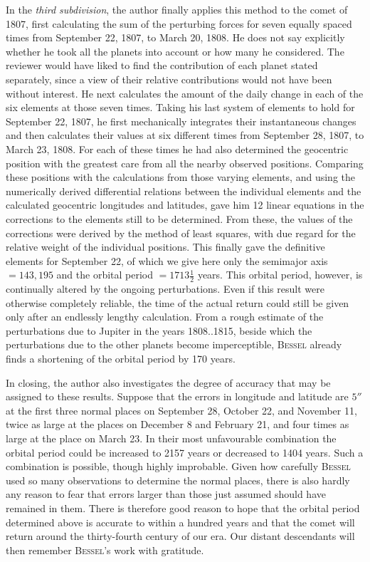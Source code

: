 In the \emph{third subdivision}, the author finally applies this method to the comet of 1807, first calculating the sum of the perturbing forces for seven equally spaced times from September 22, 1807, to March 20, 1808. He does not say explicitly whether he took all the planets into account or how many he considered. The reviewer would have liked to find the contribution of each planet stated separately, since a view of their relative contributions would not have been without interest. He next calculates the amount of the daily change in each of the six elements at those seven times. Taking his last system of elements to hold for September 22, 1807, he first mechanically integrates their instantaneous changes and then calculates their values at six different times from September 28, 1807, to March 23, 1808. For each of these times he had also determined the geocentric position with the greatest care from all the nearby observed positions. Comparing these positions with the calculations from those varying elements, and using the numerically derived differential relations between the individual elements and the calculated geocentric longitudes and latitudes, gave him 12 linear equations in the corrections to the elements still to be determined. From these, the values of the corrections were derived by the method of least squares, with due regard for the relative weight of the individual positions. This finally gave the definitive elements for September 22, of which we give here only the semimajor axis $= 143{,}195$ and the orbital period $= 1713\tfrac{1}{2}$ years. This orbital period, however, is continually altered by the ongoing perturbations. Even if this result were otherwise completely reliable, the time of the actual return could still be given only after an endlessly lengthy calculation. From a rough estimate of the perturbations due to Jupiter in the years 1808..1815, beside which the perturbations due to the other planets become imperceptible, \textsc{Bessel} already finds a shortening of the orbital period by 170 years.

In closing, the author also investigates the degree of accuracy that may be assigned to these results. Suppose that the errors in longitude and latitude are $5''$ at the first three normal places on September 28, October 22, and November 11, twice as large at the places on December 8 and February 21, and four times as large at the place on March 23. In their most unfavourable combination the orbital period could be increased to 2157 years or decreased to 1404 years. Such a combination is possible, though highly improbable. Given how carefully \textsc{Bessel} used so many observations to determine the normal places, there is also hardly any reason to fear that errors larger than those just assumed should have remained in them. There is therefore good reason to hope that the orbital period determined above is accurate to within a hundred years and that the comet will return around the thirty-fourth century of our era. Our distant descendants will then remember \textsc{Bessel}'s work with gratitude.

